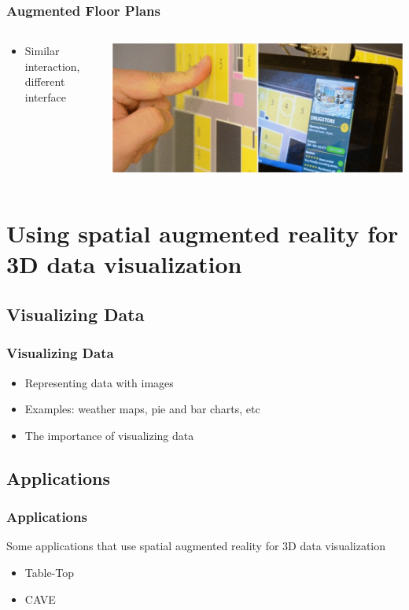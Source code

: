 \documentclass{beamer}
\begin{document}
\begin{frame}
	\frametitle{Augmented Floor Plans}
	\begin{columns}
	\begin{column}{0.45\textwidth}
	\begin{itemize}
		\item Similar interaction, different interface
	\end{itemize}
	\end{column}
	\begin{column}{0.55\textwidth}
	\includegraphics[width=\textwidth]{images/AugmentedFloorPlans}
	
	\cite{3D}
	\end{column}
	\end{columns}	
\end{frame}

\section[Using spatial augmented reality for 3D data visualization]{Using spatial augmented reality for 3D data visualization}

\subsection{Visualizing Data}
\begin{frame}	
\frametitle{Visualizing Data}
	\begin{itemize}
		\item Representing data with images
		\item Examples: weather maps, pie and bar charts, etc
		\item The importance of visualizing data
	\end{itemize}
\end{frame}

\subsection{Applications}
\begin{frame}
\frametitle{Applications}
	Some applications that use spatial augmented reality for 3D data visualization   
	\begin{itemize}
		\item Table-Top
		\item CAVE
	\end{itemize}
\end{frame}
\end{document}
